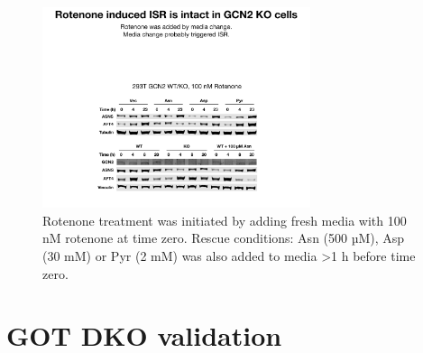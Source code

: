 \begin{figure}[ht]
    \centering
    \includegraphics[width=0.70\textwidth]{figures/sapp/ISR/293T_GCN2_ISR.pdf}
    \caption[ATF4 post mito inhib. GCN2 KO, western]{
    Rotenone treatment was initiated by adding fresh media with 100 nM rotenone at time zero.
    Rescue conditions: Asn (500 µM), Asp (30 mM) or Pyr (2 mM) was also added to media >1 h before time zero.
    }
    \label{fig:sapp:ISR:293T_GCN2_ISR}
\end{figure}







\section{GOT DKO validation}





























